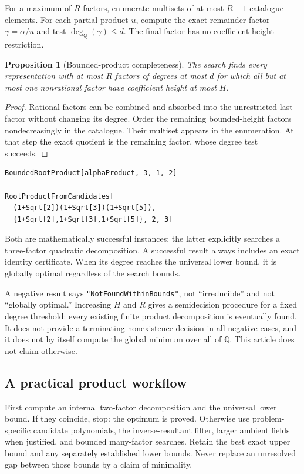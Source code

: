 \documentclass[11pt,a4paper]{article}
\newcommand{\Q}{\mathbb Q}
\newcommand{\Qbar}{\overline{\mathbb Q}}
\newcommand{\degQ}{\operatorname{deg}_{\Q}}
\newcommand{\code}[1]{\texttt{#1}}
\newtheorem{proposition}[theorem]{Proposition}
\theoremstyle{remark}\newtheorem{remark}[theorem]{Remark}
\begin{document}
For a maximum of $R$ factors, enumerate multisets of at most $R-1$ catalogue elements. For each partial product $u$, compute the exact remainder factor $\gamma=\alpha/u$ and test $\degQ(\gamma)\le d$. The final factor has no coefficient-height restriction.

\begin{proposition}[Bounded-product completeness]
The search finds every representation with at most $R$ factors of degrees at most $d$ for which all but at most one nonrational factor have coefficient height at most $H$.
\end{proposition}
\begin{proof}
Rational factors can be combined and absorbed into the unrestricted last factor without changing its degree. Order the remaining bounded-height factors nondecreasingly in the catalogue. Their multiset appears in the enumeration. At that step the exact quotient is the remaining factor, whose degree test succeeds.
\end{proof}

\begin{lstlisting}
BoundedRootProduct[alphaProduct, 3, 1, 2]

RootProductFromCandidates[
  (1+Sqrt[2])(1+Sqrt[3])(1+Sqrt[5]),
  {1+Sqrt[2],1+Sqrt[3],1+Sqrt[5]}, 2, 3]
\end{lstlisting}
Both are mathematically successful instances; the latter explicitly searches a three-factor quadratic decomposition. A successful result always includes an exact identity certificate. When its degree reaches the universal lower bound, it is globally optimal regardless of the search bounds.

A negative result says \code{"NotFoundWithinBounds"}, not ``irreducible'' and not ``globally optimal.'' Increasing $H$ and $R$ gives a semidecision procedure for a fixed degree threshold: every existing finite product decomposition is eventually found. It does not provide a terminating nonexistence decision in all negative cases, and it does not by itself compute the global minimum over all of $\Qbar$. This article does not claim otherwise.

\subsection{A practical product workflow}
First compute an internal two-factor decomposition and the universal lower bound. If they coincide, stop: the optimum is proved. Otherwise use problem-specific candidate polynomials, the inverse-resultant filter, larger ambient fields when justified, and bounded many-factor searches. Retain the best exact upper bound and any separately established lower bounds. Never replace an unresolved gap between those bounds by a claim of minimality.
\end{document}
